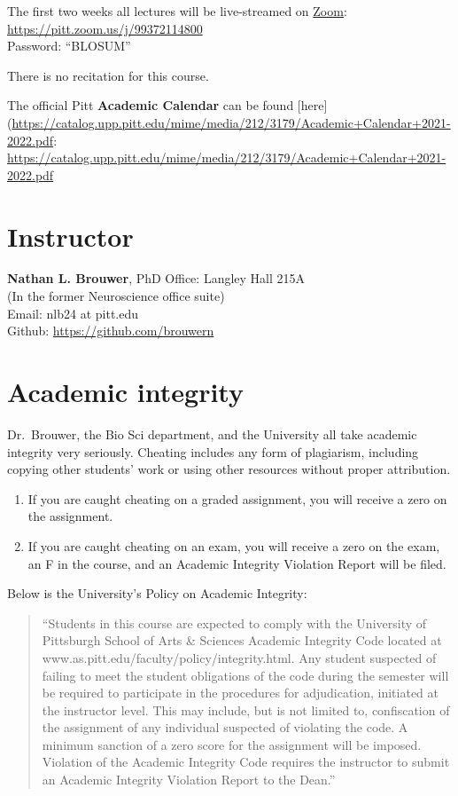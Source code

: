\documentclass[
]{book}
\providecommand{\tightlist}{%
  \setlength{\itemsep}{0pt}\setlength{\parskip}{0pt}}
\begin{document}
The first two weeks all lectures will be live-streamed on \href{https://pitt.zoom.us/j/99372114800}{Zoom}: \url{https://pitt.zoom.us/j/99372114800}\\
Password: ``BLOSUM''

There is no recitation for this course.

The official Pitt \textbf{Academic Calendar} can be found {[}here{]}(\url{https://catalog.upp.pitt.edu/mime/media/212/3179/Academic+Calendar+2021-2022.pdf}: \url{https://catalog.upp.pitt.edu/mime/media/212/3179/Academic+Calendar+2021-2022.pdf}

\hypertarget{nlb}{%
\chapter{Instructor}\label{nlb}}

\textbf{Nathan L. Brouwer}, PhD
Office: Langley Hall 215A\\
(In the former Neuroscience office suite)\\
Email: nlb24 at pitt.edu\\
Github: \url{https://github.com/brouwern}

\hypertarget{academic-integrity}{%
\chapter{Academic integrity}\label{academic-integrity}}

Dr.~Brouwer, the Bio Sci department, and the University all take academic integrity very seriously. Cheating includes any form of plagiarism, including copying other students' work or using other resources without proper attribution.

\begin{enumerate}
\def\labelenumi{\arabic{enumi}.}
\tightlist
\item
  If you are caught cheating on a graded assignment, you will receive a zero on the assignment.
\item
  If you are caught cheating on an exam, you will receive a zero on the exam, an F in the course, and an Academic Integrity Violation Report will be filed.
\end{enumerate}

Below is the University's Policy on Academic Integrity:

\begin{quote}
``Students in this course are expected to comply with the University of Pittsburgh School of Arts \& Sciences Academic Integrity Code located at www.as.pitt.edu/faculty/policy/integrity.html. Any student suspected of failing to meet the student obligations of the code during the semester will be required to participate in the procedures for adjudication, initiated at the instructor level. This may include, but is not limited to, confiscation of the assignment of any individual suspected of violating the code. A minimum sanction of a zero score for the assignment will be imposed. Violation of the Academic Integrity Code requires the instructor to submit an Academic Integrity Violation Report to the Dean.''
\end{quote}
\end{document}
